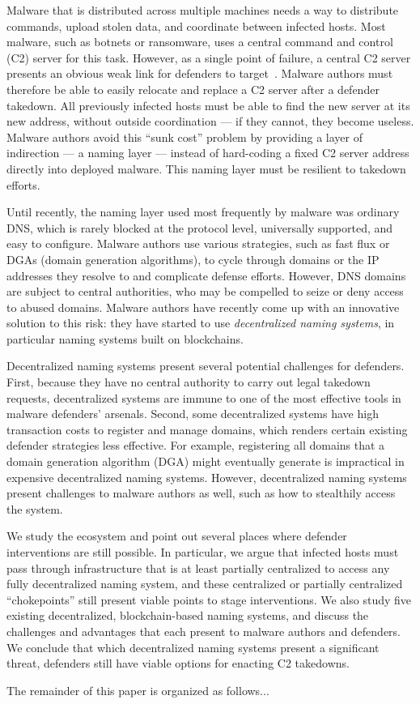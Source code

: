 Malware that is distributed across multiple machines needs a way to distribute 
commands, upload stolen 
data, and coordinate between infected hosts. Most malware, such as botnets or 
ransomware, uses a 
central command and control (C2) server for this task. However, as a single 
point of failure, a 
central C2 server presents an obvious weak link for defenders to 
target~\cite{kesari_deterring_2017}. 
Malware authors must therefore be able to easily relocate and replace a C2 
server after a defender 
takedown. All previously infected hosts must be able to find the new server at 
its new address, 
without outside coordination --- if they cannot, they become useless. Malware 
authors avoid 
this ``sunk cost'' problem by providing a layer of indirection --- a naming 
layer --- instead of 
hard-coding a fixed C2 server address directly into deployed malware. This 
naming layer must be 
resilient to takedown efforts.

Until recently, the naming layer used most frequently by malware was ordinary 
DNS, which is rarely 
blocked at the protocol level, universally supported, and easy to configure. 
Malware authors use 
various strategies, such as fast flux or DGAs (domain generation algorithms), 
to cycle through domains 
or the IP addresses they resolve to and complicate defense efforts. However, 
DNS domains are subject 
to central authorities, who may be compelled to seize or deny access to abused 
domains. Malware 
authors have recently come up with an innovative solution to this risk: they 
have started to use 
\emph{decentralized naming systems}, in particular naming systems built on 
blockchains. 

Decentralized naming systems present several potential challenges for 
defenders. First, because they 
have no central authority to carry out legal takedown requests, decentralized 
systems are immune to 
one of the most effective tools in malware defenders' arsenals. Second, some 
decentralized systems 
have high transaction costs to register and manage domains, which renders 
certain existing defender 
strategies less effective. For example, registering all domains that a domain 
generation algorithm (DGA) 
might eventually generate 
is impractical in expensive decentralized naming systems. However, 
decentralized naming systems 
present challenges to malware authors as well, such as how to stealthily access 
the system.

We study the ecosystem and point out several places where defender 
interventions are still possible. 
In particular, we argue that infected hosts must pass through infrastructure 
that is at least 
partially centralized to access any fully decentralized naming system, and 
these centralized or 
partially centralized ``chokepoints'' still present viable points to stage 
interventions. We also 
study five existing decentralized, blockchain-based naming systems, and discuss 
the challenges and 
advantages that each present to malware authors and defenders. We conclude that 
which decentralized 
naming systems present a significant threat, defenders still have viable 
options for enacting C2 
takedowns.

The remainder of this paper is organized as follows...